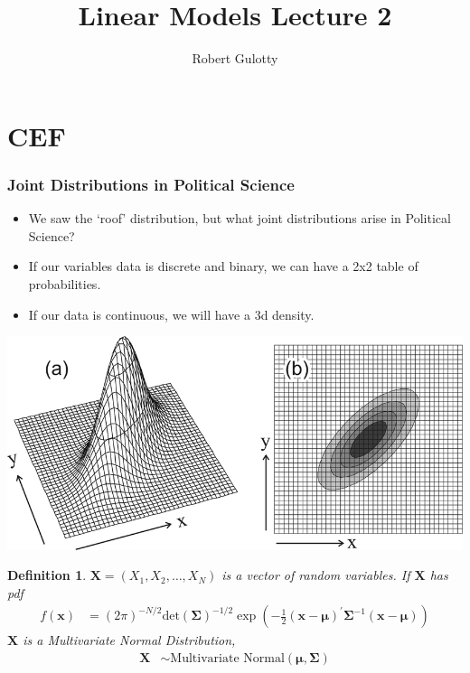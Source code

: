 \documentclass[aspectratio=169, handout]{beamer}
\title[PLSC 30700]{Linear Models Lecture 2}
\author{Robert Gulotty}
\institute[Chicago]{University of Chicago}
\newtheorem{defn}{Definition}
\numberwithin{equation}{section}
\begin{document}
\begin{frame}
\maketitle
\end{frame}


\section{CEF}
\begin{frame}
\frametitle{Joint Distributions in Political Science}
\begin{itemize}
\item We saw the `roof' distribution, but what joint distributions arise in Political Science?
\item If our variables data is discrete and binary, we can have a 2x2 table of probabilities.
\item If our data is continuous, we will have a 3d density.
\end{itemize}
\end{frame}

\begin{frame}
\begin{center}
\includegraphics[width=4 in]{Images/CEF/Illustration.png}
\end{center}
\end{frame}

\begin{frame}
\begin{defn}
$\boldsymbol{X} = (X_{1}, X_{2}, \hdots, X_{N}) $ is a vector of random variables.  If $\boldsymbol{X}$ has pdf 
\begin{align*}
f(\boldsymbol{x}) & = (2 \pi)^{-N/2} \text{det}\left(\boldsymbol{\Sigma}\right)^{-1/2} \exp\left(-\frac{1}{2}(\boldsymbol{x} - \boldsymbol{\mu})^{'}\boldsymbol{\Sigma}^{-1} (\boldsymbol{x} - \boldsymbol{\mu} ) \right) 
\end{align*}
$\boldsymbol{X}$ is a \alert{Multivariate Normal} Distribution,
\begin{align*}
\boldsymbol{X} & \sim  \text{Multivariate Normal} (\boldsymbol{\mu}, \boldsymbol{\Sigma})
\end{align*}
\end{defn}
\end{frame}
\end{document}
